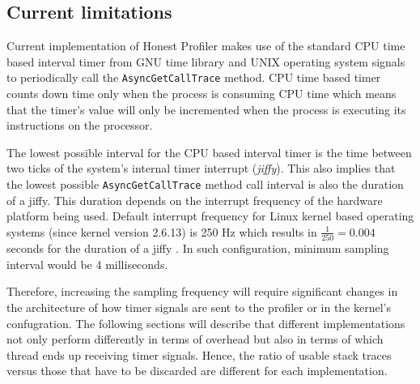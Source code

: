 \documentclass[..thesis.tex]{subfiles}
\begin{document}

\subsection{Current limitations}
Current implementation of Honest Profiler makes use of the standard CPU time based interval timer from GNU time library and UNIX operating system signals to periodically call the \texttt{AsyncGetCallTrace} method. CPU time based timer counts down time only when the process is consuming CPU time which means that the timer's value will only be incremented when the process is executing its instructions on the processor.

The lowest possible interval for the CPU based interval timer is the time between two ticks of the system's internal timer interrupt (\textit{jiffy}). This also implies that the lowest possible \texttt{Async\-Get\-Call\-Trace} method call interval is also the duration of a jiffy. This duration depends on the interrupt frequency of the hardware platform being used. Default interrupt frequency for Linux kernel based operating systems (since kernel version 2.6.13) is 250 Hz which results in $\frac{1}{250} = 0.004$ seconds for the duration of a jiffy \cite{linux_time}. In such configuration, minimum sampling interval would be 4 milliseconds.

Therefore, increasing the sampling frequency will require significant changes in the architecture of how timer signals are sent to the profiler or in the kernel's confugration. The following sections will describe that different implementations not only perform differently in terms of overhead but also in terms of which thread ends up receiving timer signals. Hence, the ratio of usable stack traces versus those that have to be discarded are different for each implementation.
\end{document}
